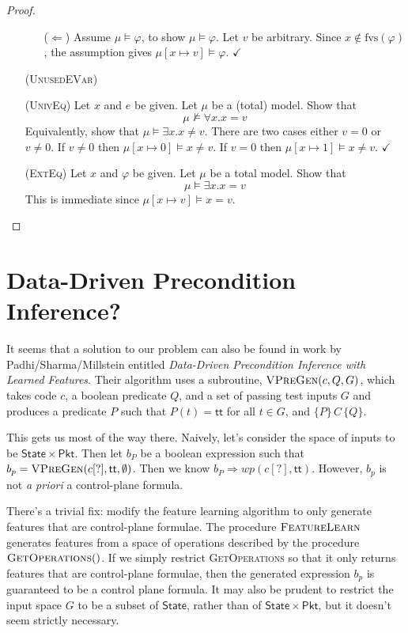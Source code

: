 \documentclass{article}
\newcommand{\TRUE}{\mathsf{tt}}
\newcommand{\Pkt}{\mathsf{Pkt}}
\newcommand{\State}{\mathsf{State}}
\newcommand{\WP}{\textit{wp}}
\newcommand{\instr}{[?]}
\newcommand{\fvs}{\textrm{fvs}}
\theoremstyle{plain}
\theoremstyle{definition}
\theoremstyle{remark}
\begin{document}
\begin{proof}
\begin{enumerate}[align=left]
\begin{enumerate}[align=left]
      \item[($\Leftarrow$)] Assume $\mu \models \varphi$, to show $\mu \models \varphi$. Let $v$ be arbitrary. Since $x \not \in \fvs(\varphi)$, the assumption gives $\mu[x \mapsto v] \models \varphi$. \hfill $\checkmark$
    \end{enumerate}

    \item[(\textsc{UnusedEVar})] 
    \item[(\textsc{UnivEq})]
    Let $x$ and $e$ be given. Let $\mu$ be a (total) model. Show that
    \[\mu \not\models \forall x. x = v\]
    Equivalently, show that $\mu \models \exists x. x \neq v$.
    There are two cases either $v = 0$ or $v \neq 0$. If $v \neq 0$ then $\mu[x \mapsto 0] \models x \neq v$.
    If $v = 0$ then $\mu[x \mapsto 1] \models x \neq v$. \hfill $\checkmark$

    \item[(\textsc{ExtEq})]
    Let $x$ and $\varphi$ be given. Let $\mu$ be a total model. Show that
    \[\mu \models \exists x. x = v\]
    This is immediate since $\mu[x \mapsto v] \models x = v$.

  \end{enumerate}

\end{proof}


\clearpage
\section{Data-Driven Precondition Inference?}


It seems that a solution to our problem can also be found in work by
Padhi/Sharma/Millstein entitled \textit{Data-Driven Precondition Inference with
  Learned Features}. Their algorithm uses a subroutine,
$\textsc{VPreGen}(c,Q,G)$, which takes code $c$, a boolean predicate $Q$,
and a set of passing test inputs $G$ and produces a predicate $P$ such that
$P(t) = \TRUE$ for all $t \in G$, and $\{P\}\,C\,\{Q\}$.

This gets us most of the way there. Naively, let's consider the space of inputs
to be $\State \times \Pkt$. Then let $b_P$ be a boolean expression such that
$b_p = \textsc{VPreGen}(c\instr,\TRUE,\emptyset)$. Then we know $b_P \Rightarrow
\WP(c\instr,\TRUE)$. However, $b_p$ is not \emph{a priori} a control-plane
formula.

There's a trivial fix: modify the feature learning algorithm to only generate
features that are control-plane formulae. The procedure $\textsc{FeatureLearn}$
generates features from a space of operations described by the procedure
$\textsc{GetOperations}()$. If we simply restrict \textsc{GetOperations} so that
it only returns features that are control-plane formulae, then the generated
expression $b_p$ is guaranteed to be a control plane formula. It may also be
prudent to restrict the input space $G$ to be a subset of $\State$, rather than
of $\State \times \Pkt$, but it doesn't seem strictly necessary.
\end{document}
